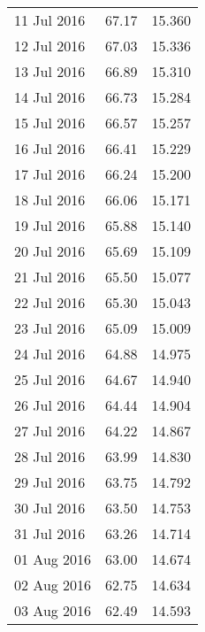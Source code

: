 \documentclass[11pt,a4paper,twoside]{article}
\begin{document}
\begin{longtable}{lcc}
11 Jul 2016                    & 67.17                & 15.360     \\
12 Jul 2016                    & 67.03                & 15.336     \\
13 Jul 2016                    & 66.89                & 15.310     \\
14 Jul 2016                    & 66.73                & 15.284     \\
15 Jul 2016                    & 66.57                & 15.257     \\
16 Jul 2016                    & 66.41                & 15.229     \\
17 Jul 2016                    & 66.24                & 15.200     \\
18 Jul 2016                    & 66.06                & 15.171     \\
19 Jul 2016                    & 65.88                & 15.140     \\
20 Jul 2016                    & 65.69                & 15.109     \\
21 Jul 2016                    & 65.50                & 15.077     \\
22 Jul 2016                    & 65.30                & 15.043     \\
23 Jul 2016                    & 65.09                & 15.009     \\
24 Jul 2016                    & 64.88                & 14.975     \\
25 Jul 2016                    & 64.67                & 14.940     \\
26 Jul 2016                    & 64.44                & 14.904    \\
27 Jul 2016                    & 64.22                & 14.867     \\
28 Jul 2016                    & 63.99                & 14.830     \\
29 Jul 2016                    & 63.75                & 14.792     \\
30 Jul 2016                    & 63.50                & 14.753     \\
31 Jul 2016                    & 63.26                & 14.714     \\
01 Aug 2016                    & 63.00                & 14.674    \\
02 Aug 2016                    & 62.75                & 14.634    \\
03 Aug 2016                    & 62.49                & 14.593    \\

\end{longtable}
\end{document}
